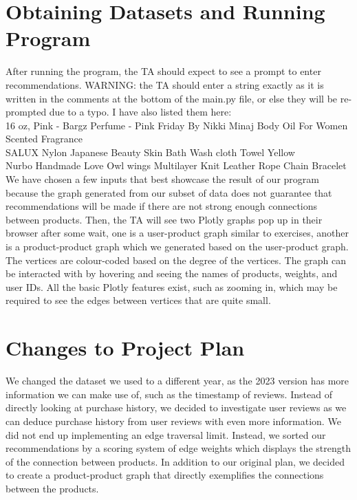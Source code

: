 \documentclass[fontsize=11pt]{article}
\begin{document}
\section*{Obtaining Datasets and Running Program}
After running the program, the TA should expect to see a prompt to enter recommendations.
WARNING: the TA should enter a string exactly as it is written in the comments at the bottom of the main.py file, or else they will be re-prompted due to a typo. I have also listed them here: \\
16 oz, Pink - Bargz Perfume - Pink Friday By Nikki Minaj Body Oil For Women Scented Fragrance \\
SALUX Nylon Japanese Beauty Skin Bath Wash cloth Towel Yellow \\
Nurbo Handmade Love Owl wings Multilayer Knit Leather Rope Chain Bracelet \\
We have chosen a few inputs that best showcase the result of our program because the graph generated from our subset of data does not guarantee that recommendations will be made if there are not strong enough connections between products.
Then, the TA will see two Plotly graphs pop up in their browser after some wait, one is a user-product graph similar to exercises, another is a product-product graph which we generated based on the user-product graph. The vertices are colour-coded based on the degree of the vertices. The graph can be interacted with by hovering and seeing the names of products, weights, and user IDs. All the basic Plotly features exist, such as zooming in, which may be required to see the edges between vertices that are quite small.

\section*{Changes to Project Plan}
We changed the dataset we used to a different year, as the 2023 version has more information we can make use of, such as the timestamp of reviews. Instead of directly looking at purchase history, we decided to investigate user reviews as we can deduce purchase history from user reviews with even more information. We did not end up implementing an edge traversal limit. Instead, we sorted our recommendations by a scoring system of edge weights which displays the strength of the connection between products. In addition to our original plan, we decided to create a product-product graph that directly exemplifies the connections between the products.
\end{document}

